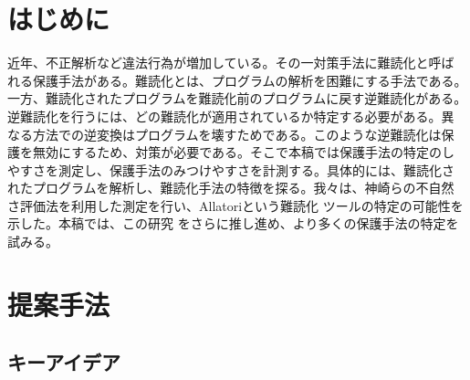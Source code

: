 \documentclass[a4j,fleqn,10pt]{jarticle}
\begin{document}

\maketitle


\section{はじめに}

近年、不正解析など違法行為が増加している。その一対策手法に難読化と呼ば
れる保護手法がある。難読化とは、プログラムの解析を困難にする手法である。
一方、難読化されたプログラムを難読化前のプログラムに戻す逆難読化がある。
逆難読化を行うには、どの難読化が適用されているか特定する必要がある。異
なる方法での逆変換はプログラムを壊すためである。このような逆難読化は保
護を無効にするため、対策が必要である。そこで本稿では保護手法の特定のし
やすさを測定し、保護手法のみつけやすさを計測する。具体的には、難読化さ
れたプログラムを解析し、難読化手法の特徴を探る。我々は、神崎らの不自然
さ評価法\cite{kanzaki14ipsj}を利用した測定を行い、Allatoriという難読化
ツールの特定の可能性を示した\cite{sagisaka15sigss}。本稿では、この研究
をさらに推し進め、より多くの保護手法の特定を試みる。

\section{提案手法}\label{sect:proposedmethod}

\subsection{キーアイデア}\label{sect:keyidea}
\end{document}
